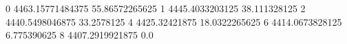 0 4463.15771484375 55.86572265625
1 4445.4033203125 38.111328125
2 4440.5498046875 33.2578125
4 4425.32421875 18.0322265625
6 4414.0673828125 6.775390625
8 4407.2919921875 0.0
